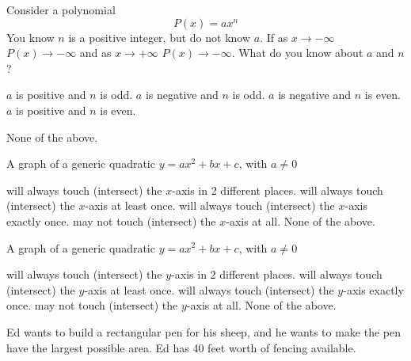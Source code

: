 \begin{questions}
\question[3] Consider a polynomial
\[P(x) = ax^n\]
You know $n$ is a positive integer, but do not know $a$. If as $x\to-\infty$ $P(x)\to-\infty$ and as $x\to+\infty$ $P(x)\to-\infty$. What do you know about $a$ and $n$?
\begin{checkboxes}
    \choice $a$ is positive and $n$ is odd.
    \choice $a$ is negative and $n$ is odd.
        \choice $a$ is negative and $n$ is even.
    \choice $a$ is positive and $n$ is even.

    \choice None of the above.
\end{checkboxes}

\newpage
\question[3] A graph of a generic quadratic $y=ax^2+bx+c$, with $a\neq0$
\begin{checkboxes}
    \choice will always touch (intersect) the $x$-axis in 2 different places.
    \choice will always touch (intersect) the $x$-axis at least once.
    \choice will always touch (intersect) the $x$-axis exactly once.
    \choice may not touch (intersect) the $x$-axis at all.
    \choice None of the above.
\end{checkboxes}

\question[3] A graph of a generic quadratic $y=ax^2+bx+c$, with $a\neq0$
\begin{checkboxes}
    \choice will always touch (intersect) the $y$-axis in 2 different places.
    \choice will always touch (intersect) the $y$-axis at least once.
    \choice will always touch (intersect) the $y$-axis exactly once.
    \choice may not touch (intersect) the $y$-axis at all.
    \choice None of the above.
\end{checkboxes}



\newpage
\question %
Ed wants to build a rectangular pen for his sheep, and he wants to make the pen have the largest possible area. Ed has 40 feet worth of fencing available. 



\end{questions}
